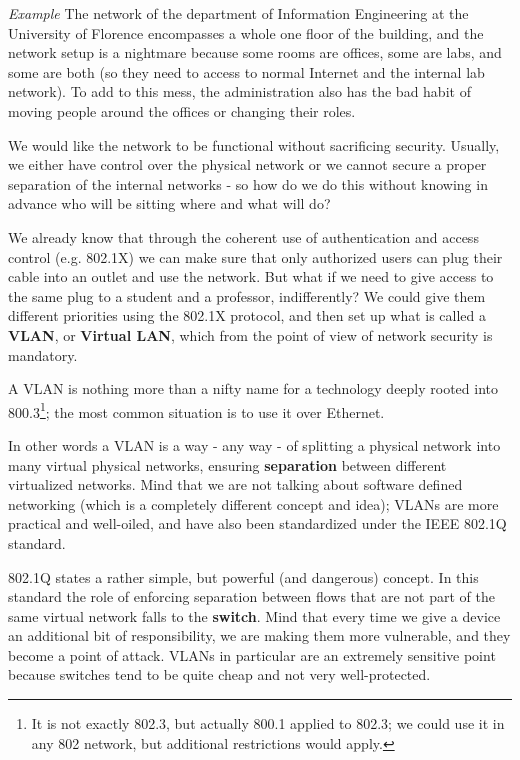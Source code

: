 \vspace{0.5em}

\emph{Example} The network of the department of Information Engineering at the University of Florence encompasses a whole one floor of the building, and the network setup is a nightmare because some rooms are offices, some are labs, and some are both (so they need to access to normal Internet and the internal lab network). To add to this mess, the administration also has the bad habit of moving people around the offices or changing their roles.

\vspace{0.5em}
 
We would like the network to be functional without sacrificing security. Usually, we either have control over the physical network or we cannot secure a proper separation of the internal networks - so how do we do this without knowing in advance who will be sitting where and what will do?
 
We already know that through the coherent use of authentication and access control (e.g. 802.1X) we can make sure that only authorized users can plug their cable into an outlet and use the network. But what if we need to give access to the same plug to a student and a professor, indifferently? We could give them different priorities using the 802.1X protocol, and then set up what is called a \textbf{VLAN}, or \textbf{Virtual LAN}, which from the point of view of network security is mandatory.
 
A VLAN is nothing more than a nifty name for a technology deeply rooted into 800.3\footnote{It is not exactly 802.3, but actually 800.1 applied to 802.3; we could use it in any 802 network, but additional restrictions would apply.}; the most common situation is to use it over Ethernet.
 
In other words a VLAN is a way - any way - of splitting a physical network into many virtual physical networks, ensuring \textbf{separation} between different virtualized networks. Mind that we are not talking about software defined networking (which is a completely different concept and idea); VLANs are more practical and well-oiled, and have also been standardized under the IEEE 802.1Q standard.
 
802.1Q states a rather simple, but powerful (and dangerous) concept. In this standard the role of enforcing separation between flows that are not part of the same virtual network falls to the \textbf{switch}. Mind that every time we give a device an additional bit of responsibility, we are making them more vulnerable, and they become a point of attack. VLANs in particular are an extremely sensitive point because switches tend to be quite cheap and not very well-protected.

